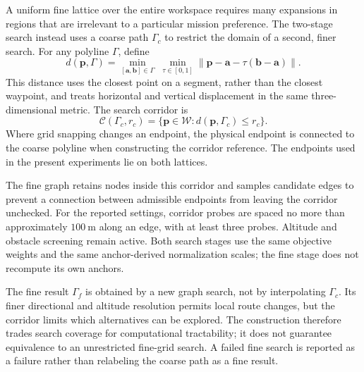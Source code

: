 \documentclass[preprint,12pt]{elsarticle}
\begin{document}
A uniform fine lattice over the entire workspace requires many expansions
in regions that are irrelevant to a particular mission preference. The
two-stage search instead uses a coarse path $\Gamma_c$ to restrict the
domain of a second, finer search. For any polyline $\Gamma$, define
\begin{equation}
 d(\mathbf p,\Gamma)=
 \min_{[\mathbf a,\mathbf b]\in\Gamma}\;
 \min_{\tau\in[0,1]}
 \|\mathbf p-\mathbf a-\tau(\mathbf b-\mathbf a)\|.
 \label{me:eq:distance}
\end{equation}
This distance uses the closest point on a segment, rather than the closest
waypoint, and treats horizontal and vertical displacement in the same
three-dimensional metric. The search corridor is
\begin{equation}
 \mathcal C(\Gamma_c,r_c)=
 \{\mathbf p\in\mathcal W:d(\mathbf p,\Gamma_c)\le r_c\}.
 \label{me:eq:corridor}
\end{equation}
Where grid snapping changes an endpoint, the physical endpoint is connected
to the coarse polyline when constructing the corridor reference. The
endpoints used in the present experiments lie on both lattices.

The fine graph retains nodes inside this corridor and samples candidate
edges to prevent a connection between admissible endpoints from leaving
the corridor unchecked. For the reported settings, corridor probes are
spaced no more than approximately $100~\mathrm{m}$ along an edge, with at
least three probes. Altitude and obstacle screening remain active. Both
search stages use the same objective weights and the same anchor-derived
normalization scales; the fine stage does not recompute its own anchors.

The fine result $\Gamma_f$ is obtained by a new graph search, not by
interpolating $\Gamma_c$. Its finer directional and altitude resolution
permits local route changes, but the corridor limits which alternatives
can be explored. The construction therefore trades search coverage for
computational tractability; it does not guarantee equivalence to an
unrestricted fine-grid search. A failed fine search is reported as a
failure rather than relabeling the coarse path as a fine result.

\end{document}
